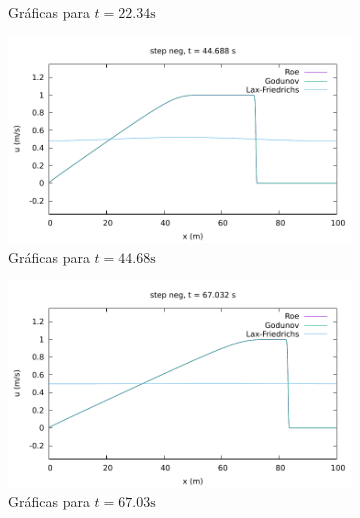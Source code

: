 \documentclass[12pt]{article}
\begin{document}
\begin{figure}[h!]
\begin{subfigure}{0.49\textwidth}
			\caption*{Gráficas para $t=22.34\unit{\second}$}
			\label{fig:gauss-step_neg-perio2}
		\end{subfigure}\par
		\begin{subfigure}{0.49\textwidth}
			\centering
			\includegraphics[width=\textwidth]{../burgers1DVF/results/sol_periodicas/step_neg/042.pdf}
			\caption*{Gráficas para $t=44.68\unit{\second}$}
			\label{fig:step_neg-perio3}
		\end{subfigure}\hfill
		\begin{subfigure}{0.49\textwidth}
			\centering
			\includegraphics[width=\textwidth]{../burgers1DVF/results/sol_periodicas/step_neg/063.pdf}
			\caption*{Gráficas para $t=67.03\unit{\second}$}
			\label{fig:step_neg-perio4}
		\end{subfigure}\par
		\begin{subfigure}{0.49\textwidth}
			\centering

\end{subfigure}
\end{figure}
\end{document}
